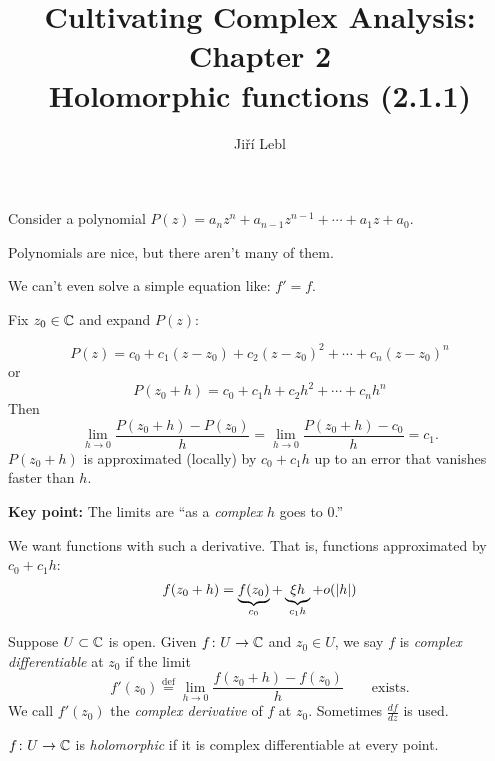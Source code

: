 \documentclass[10pt,aspectratio=169]{beamer}
\author{Ji\v{r}\'i Lebl}
\institute[OSU]{%
Departemento pri Matematiko de Oklahoma {\^S}tata Universitato}
\title{Cultivating Complex Analysis: Chapter 2\\%
Holomorphic functions (2.1.1)}
\date{}
\begin{document}
\begin{frame}
\titlepage
\end{frame}

\begin{frame}

\section{}
Consider a polynomial
$P(z) = a_n z^n + a_{n-1} z^{n-1} + \cdots + a_1 z + a_0$.

\medskip
\pause

Polynomials are nice, but there aren't many of them.

\medskip
\pause

We can't even solve a simple equation like: $f'=f$.

\medskip
\pause

Fix $z_0 \in {\mathbb{C}}$ and expand $P(z)$:

\[
P(z) = c_0 + c_1 (z-z_0) + c_2 {(z-z_0)}^2 + \cdots + c_n {(z-z_0)}^n
\]
\pause
or
\[
P(z_0+h) = c_0 + c_1 h + c_2 h^2 + \cdots + c_n h^n
\]
\pause
Then
\[
\lim_{h \to 0} \frac{P(z_0+h) - P(z_0)}{h} =
\lim_{h \to 0} \frac{P(z_0+h) - c_0}{h} = c_1 .
\]
\pause
$P(z_0+h)$ is approximated (locally) by $c_0 + c_1 h$
up to an error that vanishes faster than $h$.

\medskip
\pause

\textbf{Key point:} The limits are ``as a \emph{complex} $h$ goes to $0$.''

\end{frame}

\begin{frame}
We want functions with such a derivative.  That is, functions approximated
by $c_0 + c_1 h$:
\[
f(z_0+h) = \underbrace{f(z_0)}_{c_0} + \underbrace{\xi h}_{c_1 h} + o(\lvert {h} \rvert)
\]

\medskip
\pause

\begin{definition}
Suppose $U \subset {\mathbb{C}}$ is open.
Given $f \colon U \to {\mathbb{C}}$ and $z_0 \in U$, we say 
$f$ is \emph{complex differentiable} at $z_0$ if
the limit
\[
f'(z_0) \overset{\text{def}}{=}
\lim_{h \to 0} \frac{f(z_0+h) - f(z_0)}{h}
\qquad \text{exists.}
\]
\pause
We call $f'(z_0)$ the \emph{complex derivative} of $f$
at $z_0$.  Sometimes $\frac{df}{dz}$ is used.
\pause

$f \colon U \to {\mathbb{C}}$ is
\emph{holomorphic}
if it is complex differentiable at every point.
\end{definition}

\end{frame}
\end{document}
